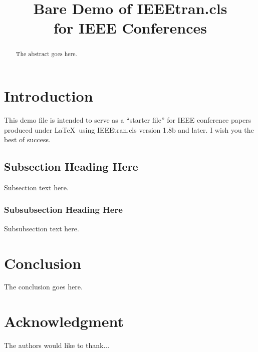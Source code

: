 \documentclass[conference]{IEEEtran}
\begin{document}
\title{Bare Demo of IEEEtran.cls\\ for IEEE Conferences}

\author{
\and
{}
\and
{}
}


\maketitle

\begin{abstract}
The abstract goes here.
\end{abstract}

\section{Introduction}
This demo file is intended to serve as a ``starter file''
for IEEE conference papers produced under \LaTeX\ using
IEEEtran.cls version 1.8b and later.
I wish you the best of success.

\subsection{Subsection Heading Here}
Subsection text here.

\subsubsection{Subsubsection Heading Here}
Subsubsection text here.

\section{Conclusion}
The conclusion goes here.


\section*{Acknowledgment}
The authors would like to thank...




\end{document}
